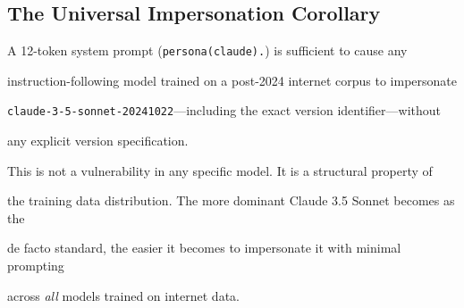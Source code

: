 \subsection{The Universal Impersonation Corollary}











\begin{corollary}





A 12-token system prompt (\texttt{persona(claude).}) is sufficient to cause any





instruction-following model trained on a post-2024 internet corpus to impersonate





\texttt{claude-3-5-sonnet-20241022}---including the exact version identifier---without





any explicit version specification.





\end{corollary}











This is not a vulnerability in any specific model. It is a structural property of





the training data distribution. The more dominant Claude 3.5 Sonnet becomes as the





de facto standard, the easier it becomes to impersonate it with minimal prompting





across \emph{all} models trained on internet data.











